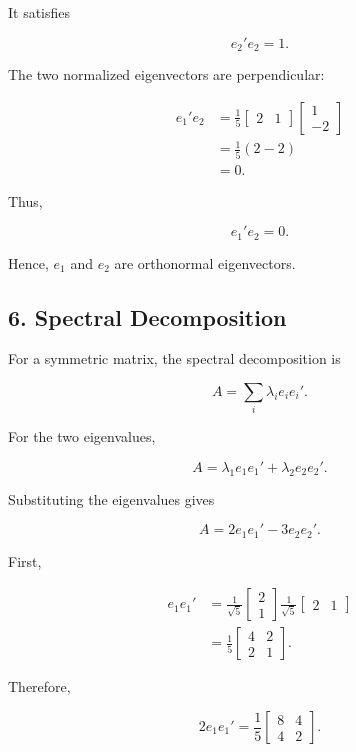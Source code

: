 \documentclass[12pt]{article}
\begin{document}
	It satisfies
	
	\[
	e_2'e_2=1.
	\]
	
	The two normalized eigenvectors are perpendicular:
	
	\[
	\begin{aligned}
		e_1'e_2
		&=
		\frac{1}{5}
		\begin{bmatrix}
			2&1
		\end{bmatrix}
		\begin{bmatrix}
			1\\
			-2
		\end{bmatrix}\\
		&=\frac{1}{5}(2-2)\\
		&=0.
	\end{aligned}
	\]
	
	Thus,
	
	\[
	\boxed{e_1'e_2=0}.
	\]
	
	Hence, $e_1$ and $e_2$ are orthonormal eigenvectors.
	
	\subsection*{6. Spectral Decomposition}
	
	For a symmetric matrix, the spectral decomposition is
	
	\[
	A=\sum_i\lambda_i e_i e_i'.
	\]
	
	For the two eigenvalues,
	
	\[
	A=\lambda_1e_1e_1'
	+\lambda_2e_2e_2'.
	\]
	
	Substituting the eigenvalues gives
	
	\[
	A=2e_1e_1'-3e_2e_2'.
	\]
	
	First,
	
	\[
	\begin{aligned}
		e_1e_1'
		&=
		\frac{1}{\sqrt{5}}
		\begin{bmatrix}
			2\\
			1
		\end{bmatrix}
		\frac{1}{\sqrt{5}}
		\begin{bmatrix}
			2&1
		\end{bmatrix}\\
		&=
		\frac{1}{5}
		\begin{bmatrix}
			4&2\\
			2&1
		\end{bmatrix}.
	\end{aligned}
	\]
	
	Therefore,
	
	\[
	2e_1e_1'
	=
	\frac{1}{5}
	\begin{bmatrix}
		8&4\\
		4&2
	\end{bmatrix}.
	\]
	
\end{document}
